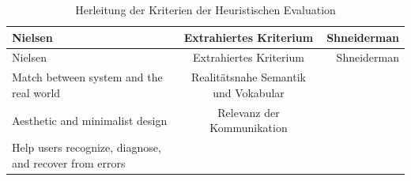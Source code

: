 \documentclass[
  12pt,
  ngerman,
  a4paper,
]{article}
\begin{document}
\begin{longtable}[]{@{}lcr@{}}
\caption{Herleitung der Kriterien der Heuristischen Evaluation
\label{tbl:mergecriteria}}\tabularnewline
\toprule
\begin{minipage}[b]{0.30\columnwidth}\raggedright
Nielsen\strut
\end{minipage} & \begin{minipage}[b]{0.31\columnwidth}\centering
Extrahiertes Kriterium\strut
\end{minipage} & \begin{minipage}[b]{0.30\columnwidth}\raggedleft
Shneiderman\strut
\end{minipage}\tabularnewline
\midrule
\endfirsthead
\toprule
\begin{minipage}[b]{0.30\columnwidth}\raggedright
Nielsen\strut
\end{minipage} & \begin{minipage}[b]{0.31\columnwidth}\centering
Extrahiertes Kriterium\strut
\end{minipage} & \begin{minipage}[b]{0.30\columnwidth}\raggedleft
Shneiderman\strut
\end{minipage}\tabularnewline
\midrule
\endhead
\begin{minipage}[t]{0.30\columnwidth}\raggedright
Match between system and the real world\strut
\end{minipage} & \begin{minipage}[t]{0.31\columnwidth}\centering
Realitätsnahe Semantik und Vokabular\strut
\end{minipage} & \begin{minipage}[t]{0.30\columnwidth}\raggedleft
\strut
\end{minipage}\tabularnewline
\begin{minipage}[t]{0.30\columnwidth}\raggedright
Aesthetic and minimalist design\strut
\end{minipage} & \begin{minipage}[t]{0.31\columnwidth}\centering
Relevanz der Kommunikation\strut
\end{minipage} & \begin{minipage}[t]{0.30\columnwidth}\raggedleft
\strut
\end{minipage}\tabularnewline
\begin{minipage}[t]{0.30\columnwidth}\raggedright
Help users recognize, diagnose, and recover from errors\strut
\end{minipage} & \begin{minipage}[t]{0.31\columnwidth}\centering

\end{minipage}
\end{longtable}
\end{document}
